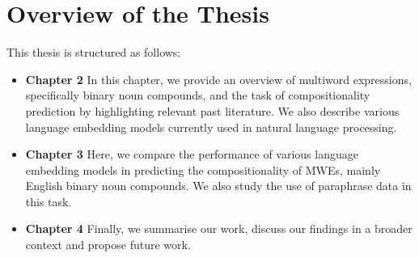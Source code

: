 \section{Overview of the Thesis}
\label{overview}
This thesis is structured as follows:
\begin{itemize}
    \item \textbf{Chapter 2}
    In this chapter, we provide an overview of multiword expressions, specifically binary noun compounds, and the task of compositionality prediction by highlighting relevant past literature. We also describe various language embedding models currently used in natural language processing.
    \item \textbf{Chapter 3} Here, we compare the performance of various language embedding models in predicting the compositionality of MWEs, mainly English binary noun compounds. We also study the use of paraphrase data in this task.
    \item \textbf{Chapter 4} Finally, we summarise our work, discuss our findings in a broader context and propose future work.
\end{itemize}